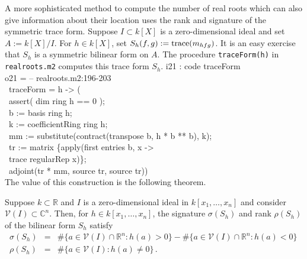 A more sophisticated method to compute the number of real roots which can also
give information about their location uses the rank and
signature of the
symmetric trace form. 
Suppose $I\subset k[X]$ is a zero-dimensional ideal and 
set $A:=k[X]/I$.
For $h\in k[X]$, set $S_h(f,g):={\rm trace}(m_{hfg})$.
It is an easy exercise that $S_h$ is a symmetric bilinear form on $A$.
The procedure {\tt traceForm(h)} in {\tt realroots.m2}
computes this trace form $S_h$.
%
\beginOutput
i21 : code traceForm\\
\emptyLine
o21 = -- realroots.m2:196-203\\
\      traceForm = h -> (\\
\           assert( dim ring h == 0 );\\
\           b  := basis ring h;\\
\           k  := coefficientRing ring h;\\
\           mm := substitute(contract(transpose b, h * b ** b), k);\\
\           tr := matrix \{apply(first entries b, x ->\\
\                     trace regularRep x)\};\\
\           adjoint(tr * mm, source tr, source tr))\\
\endOutput
%
The value of this construction is the following theorem.

\begin{theorem}\label{t:PRS}
Suppose $k\subset{\mathbb R}$ and $I$ is a zero-dimensional ideal in
$k[x_1,\ldots,x_n]$ and consider ${\mathcal V}(I)\subset {\mathbb C}^n$. 
Then, for $h\in k[x_1,\ldots,x_n]$, the signature $\sigma(S_h)$ and rank 
$\rho(S_h)$ of the bilinear form $S_h$ satisfy
\begin{eqnarray*}
\sigma(S_h)&=&\#\{a\in{\mathcal V}(I)\cap{\mathbb R}^n:h(a)>0\}
            - \#\{a\in{\mathcal V}(I)\cap{\mathbb R}^n:h(a)<0\}\,\\
\rho(S_h)&=&\#\{a\in{\mathcal V}(I):h(a)\neq0\}\,.
\end{eqnarray*}
\end{theorem}

